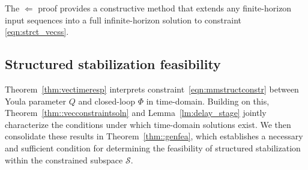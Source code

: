 \begin{rem}
The $\Leftarrow$ proof provides a constructive method that extends any finite-horizon input sequences into a full infinite-horizon solution to constraint \eqref{eqn:strct_vecss}.
\end{rem}




\subsection{Structured stabilization feasibility}

Theorem~\ref{thm:vectimeresp} interprets constraint~\eqref{eqn:mmstructconstr} between Youla parameter \(Q\) and closed-loop \(\Phi\) in time-domain. Building on this, Theorem~\ref{thm::vecconstraintsoln} and Lemma~\ref{lm:delay_stage} jointly characterize the conditions under which time-domain solutions exist. We then consolidate these results in Theorem~\ref{thm::genfea}, which establishes a necessary and sufficient condition for determining the feasibility of structured stabilization within the constrained subspace $\mathcal{S}$. 


